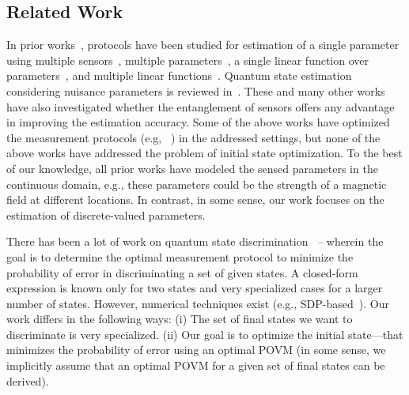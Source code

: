 \subsection{Related Work}
\label{sec:related}

In prior works~\cite{Eldredge_2018,Rubio_2020}, protocols have been studied for estimation of a single parameter using multiple sensors~\cite{Giovannetti_2011}, multiple parameters~\cite{mpe_2018,mpe_2020}, a single linear function over parameters~\cite{Eldredge_2018,mpe_2018,Sidhu_2020}, and multiple linear functions~\cite{Rubio_2020,Altenburg_2019}. 
Quantum state estimation considering nuisance parameters is reviewed in~\cite{Suzuki_2020}.
These and many other works~\cite{Eldredge_2018,mpe_2018,Jacobs_2018} have also
investigated whether the entanglement of sensors offers any advantage 
in improving the estimation accuracy. Some of the above works have optimized
the measurement protocols (e.g, ~\cite{Eldredge_2018,PhysRevA.qsn}) in the addressed
settings, but none of the above works have addressed the problem of initial state optimization.
To the best of our knowledge, all prior works have modeled the 
sensed parameters in the continuous domain, e.g., these parameters could be the 
strength of a magnetic field at different locations. In contrast, in some sense, our work focuses on the estimation of discrete-valued parameters. 


There has been a lot of work on quantum state discrimination~\cite{bergou-review-2007,bergou2004,Bae_2015,Barnett-review} -- wherein the goal is to determine the 
optimal measurement protocol to minimize the probability of error
in discriminating a set of given states. 
A closed-form expression is known only for two states and very specialized cases for a larger
number of states. However, numerical techniques exist (e.g., SDP-based~\cite {Eldar_2003}).
Our work differs in the following ways: (i) The set of final states we want to discriminate is very 
specialized. (ii) Our goal is to optimize the initial state---that minimizes the probability of error using an optimal POVM (in some sense, we implicitly assume that an optimal POVM for a given set of final states can be derived). 


